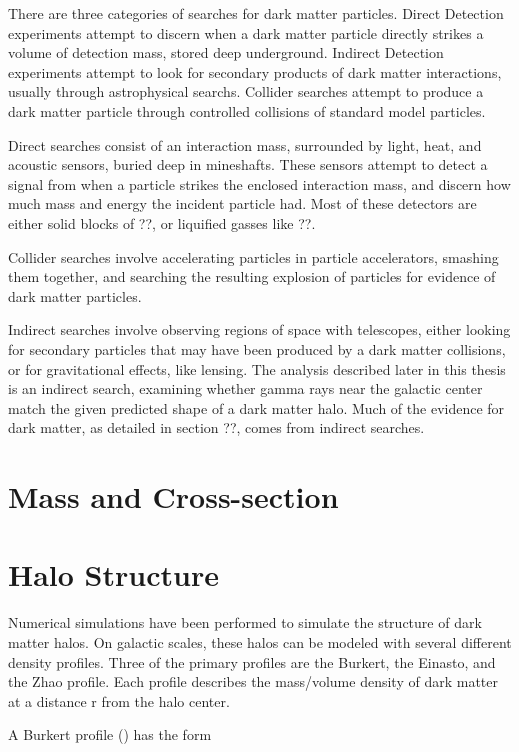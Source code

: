 There are three categories of searches for dark matter particles.
Direct Detection experiments attempt to discern when a dark matter particle directly strikes a volume of detection mass, stored deep underground.
Indirect Detection experiments attempt to look for secondary products of dark matter interactions, usually through astrophysical searchs.
Collider searches attempt to produce a dark matter particle through controlled collisions of standard model particles.

Direct searches consist of an interaction mass, surrounded by light, heat, and acoustic sensors, buried deep in mineshafts.
These sensors attempt to detect a signal from when a particle strikes the enclosed interaction mass, and discern how much mass and energy the incident particle had.
Most of these detectors are either solid blocks of ??, or liquified gasses like ??.

Collider searches involve accelerating particles in particle accelerators, smashing them together, and searching the resulting explosion of particles for evidence of dark matter particles.

Indirect searches involve observing regions of space with telescopes, either looking for secondary particles that may have been produced by a dark matter collisions, or for gravitational effects, like lensing.
The analysis described later in this thesis is an indirect search, examining whether gamma rays near the galactic center match the given predicted shape of a dark matter halo.
Much of the evidence for dark matter, as detailed in section ??, comes from indirect searches.



\section{Mass and Cross-section}


\section{Halo Structure}
Numerical simulations have been performed to simulate the structure of dark matter halos.
On galactic scales, these halos can be modeled with several different density profiles.
Three of the primary profiles are the Burkert, the Einasto, and the Zhao profile.
Each profile describes the mass/volume density of dark matter at a distance r from the halo center.

A Burkert profile (\cite{burkertprofile}) has the form

